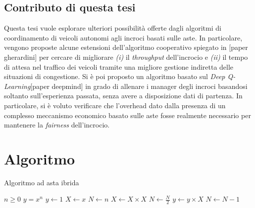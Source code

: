 \documentclass[letterpaper, 12pt]{article}
\begin{document}
\subsection{Contributo di questa tesi}
\label{sec:orgb47c539}
Questa tesi vuole esplorare ulteriori possibilità offerte dagli algoritmi
di coordinamento di veicoli autonomi agli incroci basati sulle aste.
In particolare, vengono proposte alcune estensioni dell'algoritmo
cooperativo spiegato in [paper gherardini] per cercare di migliorare
\emph{(i)} il \emph{throughput} dell'incrocio e \emph{(ii)} il tempo di attesa nel 
traffico dei veicoli tramite una migliore gestione indiretta delle situazioni
di congestione.
Si è poi proposto un algoritmo basato sul \emph{Deep Q-Learning}[paper deepmind]
in grado di allenare i manager degli incroci basandosi soltanto sull'esperienza
passata, senza avere a disposizione dati di partenza.
In particolare, si è voluto verificare che l'overhead dato dalla presenza di 
un complesso meccanismo economico basato sulle aste fosse realmente necessario per mantenere
la \emph{fairness} dell'incrocio.
\newpage
\section{Algoritmo}
\label{sec:org4f8c7a3}
\begin{algorithm}
\caption{Algoritmo ad asta ibrida}\label{alg:cap}
\begin{algorithmic}
\Require $n \geq 0$
\Ensure $y = x^n$
\State $y \gets 1$
\State $X \gets x$
\State $N \gets n$
    \State $X \gets X \times X$
    \State $N \gets \frac{N}{2}$  
    \State $y \gets y \times X$
    \State $N \gets N - 1$
\EndIf
\EndWhile
\end{algorithmic}
\end{algorithm}
\end{document}
